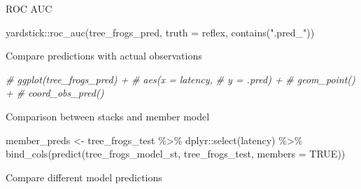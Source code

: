 \documentclass[
]{book}
\newenvironment{Shaded}{\begin{snugshade}}{\end{snugshade}}
\newcommand{\AttributeTok}[1]{\textcolor[rgb]{0.77,0.63,0.00}{#1}}
\newcommand{\CommentTok}[1]{\textcolor[rgb]{0.56,0.35,0.01}{\textit{#1}}}
\newcommand{\ConstantTok}[1]{\textcolor[rgb]{0.00,0.00,0.00}{#1}}
\newcommand{\FunctionTok}[1]{\textcolor[rgb]{0.00,0.00,0.00}{#1}}
\newcommand{\NormalTok}[1]{#1}
\newcommand{\OtherTok}[1]{\textcolor[rgb]{0.56,0.35,0.01}{#1}}
\newcommand{\SpecialCharTok}[1]{\textcolor[rgb]{0.00,0.00,0.00}{#1}}
\newcommand{\StringTok}[1]{\textcolor[rgb]{0.31,0.60,0.02}{#1}}
\begin{document}
ROC AUC

\begin{Shaded}
\begin{Highlighting}[]
\NormalTok{yardstick}\SpecialCharTok{::}\FunctionTok{roc\_auc}\NormalTok{(tree\_frogs\_pred,}
                   \AttributeTok{truth =}\NormalTok{ reflex,}
                   \FunctionTok{contains}\NormalTok{(}\StringTok{".pred\_"}\NormalTok{))}
\end{Highlighting}
\end{Shaded}

Compare predictions with actual observations

\begin{Shaded}
\begin{Highlighting}[]
\CommentTok{\# ggplot(tree\_frogs\_pred) +}
\CommentTok{\#     aes(x = latency,}
\CommentTok{\#         y = .pred) +}
\CommentTok{\#     geom\_point() +}
\CommentTok{\#     coord\_obs\_pred()}
\end{Highlighting}
\end{Shaded}

Comparison between stacks and member model

\begin{Shaded}
\begin{Highlighting}[]
\NormalTok{member\_preds }\OtherTok{\textless{}{-}}
\NormalTok{    tree\_frogs\_test }\SpecialCharTok{\%\textgreater{}\%}
\NormalTok{    dplyr}\SpecialCharTok{::}\FunctionTok{select}\NormalTok{(latency) }\SpecialCharTok{\%\textgreater{}\%}
    \FunctionTok{bind\_cols}\NormalTok{(}\FunctionTok{predict}\NormalTok{(tree\_frogs\_model\_st, tree\_frogs\_test, }\AttributeTok{members =} \ConstantTok{TRUE}\NormalTok{))}
\end{Highlighting}
\end{Shaded}

Compare different model predictions

\begin{Shaded}
\end{Shaded}
\end{document}
